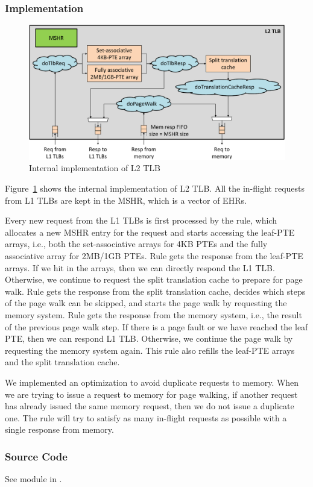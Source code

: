 \subsubsection{Implementation}

\begin{figure}
    \centering
    \includegraphics[width=\columnwidth]{fig/l2_tlb_crop.pdf}
    \caption{Internal implementation of L2 TLB}\label{fig:l2-tlb-impl}
\end{figure}

Figure~\ref{fig:l2-tlb-impl} shows the internal implementation of L2 TLB.
All the in-flight requests from L1 TLBs are kept in the MSHR, which is a vector of EHRs.

Every new request from the L1 TLBs is first processed by the  rule, which allocates a new MSHR entry for the request and starts accessing the leaf-PTE arrays, i.e., both the set-associative arrays for 4KB PTEs and the fully associative array for 2MB/1GB PTEs.
Rule  gets the response from the leaf-PTE arrays.
If we hit in the arrays, then we can directly respond the L1 TLB.
Otherwise, we continue to request the split translation cache to prepare for page walk.
Rule  gets the response from the split translation cache, decides which steps of the page walk can be skipped, and starts the page walk by requesting the memory system.
Rule  gets the response from the memory system, i.e., the result of the previous page walk step.
If there is a page fault or we have reached the leaf PTE, then we can respond L1 TLB.
Otherwise, we continue the page walk by requesting the memory system again.
This rule also refills the leaf-PTE arrays and the split translation cache.

We implemented an optimization to avoid duplicate requests to memory.
When we are trying to issue a request to memory for page walking, if another request has already issued the same memory request, then we do not issue a duplicate one.
The  rule will try to satisfy as many in-flight requests as possible with a single response from memory.

\subsubsection{Source Code}
See module  in .
